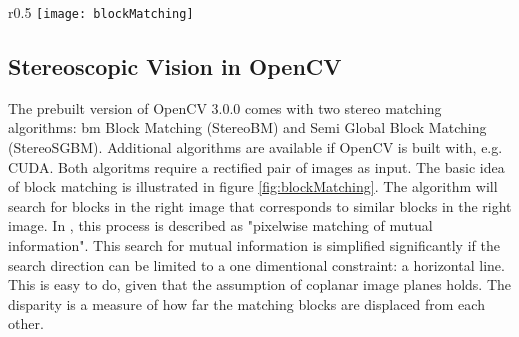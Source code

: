 \begin{wrapfigure}{r}{0.5\textwidth}
	\vspace{-10pt} %
	\centering
	\texttt{[image: blockMatching]}
	\caption{Block matching along the epipolar line.}
	\label{fig:blockMatching}
\end{wrapfigure}

\subsection{Stereoscopic Vision in OpenCV}

The prebuilt version of OpenCV 3.0.0 comes with two stereo matching algorithms: \gls{bm} Block Matching (StereoBM) and Semi Global Block Matching (StereoSGBM)\cite{hirschmullerstereo}. Additional algorithms are available if OpenCV is built with, e.g. CUDA. Both algoritms require a rectified pair of images as input. The basic idea of block matching is illustrated in figure \ref{fig:blockMatching}. The algorithm will search for blocks in the right image that corresponds to similar blocks in the right image. In \cite{hirschmullerstereo}, this process is described as "pixelwise matching of mutual information". This search for mutual information is simplified significantly if the search direction can be limited to a one dimentional constraint: a horizontal line. This is easy to do, given that the assumption of coplanar image planes holds. The disparity is a measure of how far the matching blocks are displaced from each other. 
